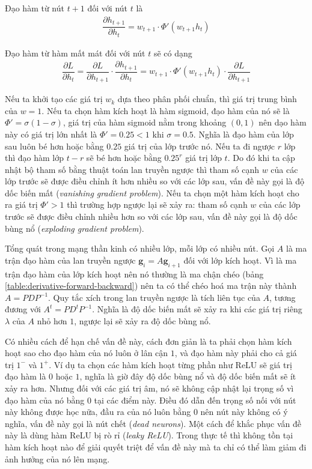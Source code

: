 Đạo hàm từ nút $t+1$ đối với nút $t$ là
\begin{align}
    \dfrac{\partial h_{t+1}}{\partial h_t}=w_{t+1}\cdot\Phi'(w_{t+1}h_t)
\end{align}

Đạo hàm từ hàm mất mát đối với nút $t$ sẽ có dạng
\begin{align}
    \dfrac{\partial L}{\partial h_t}=\dfrac{\partial L}{\partial h_{t+1}}\cdot\dfrac{\partial h_{t+1}}{\partial h_t}=w_{t+1}\cdot\Phi'(w_{t+1}h_t)\cdot\dfrac{\partial L}{\partial h_{t+1}}
\end{align}

Nếu ta khởi tạo các giá trị $w_k$ dựa theo phân phối chuẩn, thì giá trị trung bình của $w=1$. Nếu ta chọn hàm kích hoạt là hàm sigmoid, đạo hàm của nó sẽ là $\Phi'=\sigma(1-\sigma)$, giá trị của hàm sigmoid nằm trong khoảng $(0,1)$ nên dạo hàm này có giá trị lớn nhất là $\Phi'=0.25<1$ khi $\sigma=0.5$. Nghĩa là đạo hàm của lớp sau luôn bé hơn hoặc bằng $0.25$ giá trị của lớp trước nó. Nếu ta đi ngược $r$ lớp thì đạo hàm lớp $t-r$ sẽ bé hơn hoặc bằng $0.25^r$ giá trị lớp $t$. Do đó khi ta cập nhật bộ tham số bằng thuật toán lan truyền ngược thì tham số cạnh $w$ của các lớp trước sẽ được điều chỉnh ít hơn nhiều so với các lớp sau, vấn đề này gọi là độ dốc biến mất (\textit{vanishing gradient problem}). Nếu ta chọn một hàm kích hoạt cho ra giá trị $\Phi'>1$ thì trường hợp ngược lại sẽ xảy ra: tham số cạnh $w$ của các lớp trước sẽ được điều chỉnh nhiều hơn so với các lớp sau, vấn đề này gọi là độ dốc bùng nổ (\textit{exploding gradient problem}).

Tổng quát trong mạng thần kinh có nhiều lớp, mỗi lớp có nhiều nút. Gọi $A$ là ma trận đạo hàm của lan truyền ngược $\mathbf g_i = A\mathbf g_{i+1}$ đối với lớp kích hoạt. Vì là ma trận đạo hàm của lớp kích hoạt nên nó thường là ma chận chéo (bảng \ref{table:derivative-forward-backward}) nên ta có thể chéo hoá ma trận này thành $A=PDP^{-1}$. Quy tắc xích trong lan truyền ngược là tích liên tục của $A$, tương đương với $A^t=PD^tP^{-1}$. Nghĩa là độ dốc biến mất sẽ xảy ra khi các giá trị riêng $\lambda$ của $A$ nhỏ hơn $1$, ngược lại sẽ xảy ra độ dốc bùng nổ. \cite{Aggarwal2023-zk}

Có nhiều cách để hạn chế vấn đề này, cách đơn giản là ta phải chọn hàm kích hoạt sao cho đạo hàm của nó luôn ở lân cận $1$, và đạo hàm này phải cho cả giá trị $1^-$ và $1^+$. Ví dụ ta chọn các hàm kích hoạt từng phần như ReLU sẽ giá trị đạo hàm là $0$ hoặc $1$, nghĩa là giờ đây độ dốc bùng nổ và độ dốc biến mất sẽ ít xảy ra hơn. Nhưng đối với các giá trị âm, nó sẽ không cập nhật lại trọng số vì đạo hàm của nó bằng $0$ tại các điểm này. Điều đó dẫn đến trọng số nối với nút này không được học nữa, đầu ra của nó luôn bằng $0$ nên nút này không có ý nghĩa, vấn đề này gọi là nút chết (\textit{dead neurons}). Một cách để khắc phục vấn đề này là dùng hàm ReLU bị rò rỉ (\textit{leaky ReLU}). Trong thực tế thì không tồn tại hàm kích hoạt nào để giải quyết triệt để vấn đề này mà ta chỉ có thể làm giảm đi ảnh hưởng của nó lên mạng.
